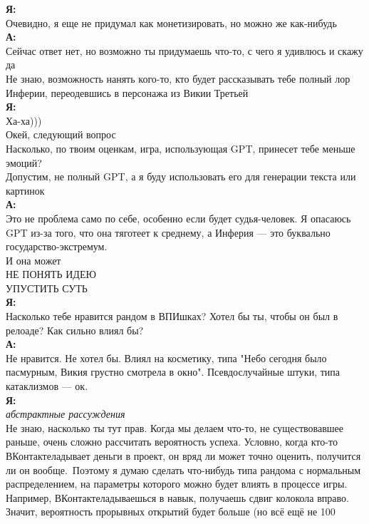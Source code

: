 \textbf{Я:}\\
Очевидно, я еще не придумал как монетизировать, но можно же как-нибудь\\

\textbf{А:}\\
Сейчас ответ нет, но возможно ты придумаешь что-то, с чего я удивлюсь и скажу да\\
Не знаю, возможность нанять кого-то, кто будет рассказывать тебе полный лор Инферии, переодевшись в персонажа из Викии Третьей\\

\textbf{Я:}\\
Ха-ха)))\\
Окей, следующий вопрос\\
Насколько, по твоим оценкам, игра, использующая GPT, принесет тебе меньше эмоций?\\
Допустим, не полный GPT, а я буду использовать его для генерации текста или картинок\\

\textbf{А:}\\
Это не проблема само по себе, особенно если будет судья-человек. Я опасаюсь GPT из-за того, что она тяготеет к среднему, а Инферия — это буквально государство-экстремум.\\
И она может\\
НЕ ПОНЯТЬ ИДЕЮ\\
УПУСТИТЬ СУТЬ\\

\textbf{Я:}\\
Насколько тебе нравится рандом в ВПИшках? Хотел бы ты, чтобы он был в релоаде? Как сильно влиял бы?\\

\textbf{А:}\\
Не нравится. Не хотел бы. Влиял на косметику, типа "Небо сегодня было пасмурным, Викия грустно смотрела в окно". Псевдослучайные штуки, типа катаклизмов — ок.\\

\textbf{Я:}\\
\textit{абстрактные рассуждения}\\
Не знаю, насколько ты тут прав. Когда мы делаем что-то, не существовавшее раньше, очень сложно рассчитать вероятность успеха. Условно, когда кто-то ВКонтактеладывает деньги в проект, он вряд ли может точно оценить, получится ли он вообще.\
Поэтому я думаю сделать что-нибудь типа рандома с нормальным распределением, на параметры которого можно будет влиять в процессе игры. Например, ВКонтактеладываешься в навык, получаешь сдвиг колокола вправо. Значит, вероятность прорывных открытий будет больше (но всё ещё не 100%

